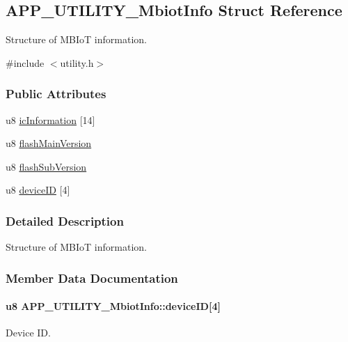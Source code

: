 \hypertarget{struct_a_p_p___u_t_i_l_i_t_y___mbiot_info}{}\subsection{A\+P\+P\+\_\+\+U\+T\+I\+L\+I\+T\+Y\+\_\+\+Mbiot\+Info Struct Reference}
\label{struct_a_p_p___u_t_i_l_i_t_y___mbiot_info}


Structure of M\+B\+IoT information.  




{\ttfamily \#include $<$utility.\+h$>$}

\subsubsection*{Public Attributes}
\begin{DoxyCompactItemize}
\item 
u8 \hyperlink{struct_a_p_p___u_t_i_l_i_t_y___mbiot_info_ac445ad9693f701328bb4bf701d67df18}{ic\+Information} \mbox{[}14\mbox{]}
\item 
u8 \hyperlink{struct_a_p_p___u_t_i_l_i_t_y___mbiot_info_ac54c090da074dc58ca72d4b7af7bbbf0}{flash\+Main\+Version}
\item 
u8 \hyperlink{struct_a_p_p___u_t_i_l_i_t_y___mbiot_info_ae86b82bb8ffa5de27543713707cca487}{flash\+Sub\+Version}
\item 
u8 \hyperlink{struct_a_p_p___u_t_i_l_i_t_y___mbiot_info_a78a3c3a9f7194e109736c792b24ba4c5}{device\+ID} \mbox{[}4\mbox{]}
\end{DoxyCompactItemize}


\subsubsection{Detailed Description}
Structure of M\+B\+IoT information. 

\subsubsection{Member Data Documentation}
\paragraph[{\texorpdfstring{device\+ID}{deviceID}}]{\setlength{\rightskip}{0pt plus 5cm}u8 A\+P\+P\+\_\+\+U\+T\+I\+L\+I\+T\+Y\+\_\+\+Mbiot\+Info\+::device\+ID\mbox{[}4\mbox{]}}\hypertarget{struct_a_p_p___u_t_i_l_i_t_y___mbiot_info_a78a3c3a9f7194e109736c792b24ba4c5}{}\label{struct_a_p_p___u_t_i_l_i_t_y___mbiot_info_a78a3c3a9f7194e109736c792b24ba4c5}
Device ID. 
